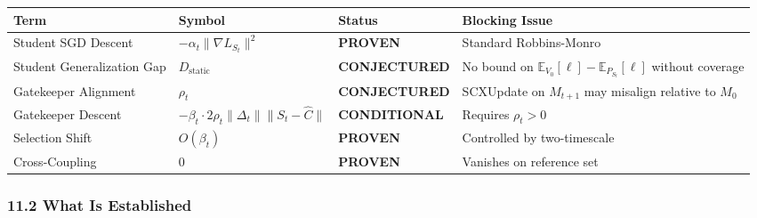 \documentclass[
  12pt,
]{article}
\begin{document}
\begin{longtable}[]{@{}
  >{\raggedright\arraybackslash}p{}
  >{\raggedright\arraybackslash}p{}
  >{\raggedright\arraybackslash}p{}
  >{\raggedright\arraybackslash}p{}@{}}
\toprule\noalign{}
\begin{minipage}[b]{\linewidth}\raggedright
Term
\end{minipage} & \begin{minipage}[b]{\linewidth}\raggedright
Symbol
\end{minipage} & \begin{minipage}[b]{\linewidth}\raggedright
Status
\end{minipage} & \begin{minipage}[b]{\linewidth}\raggedright
Blocking Issue
\end{minipage} \\
\midrule\noalign{}
\endhead
\bottomrule\noalign{}
\endlastfoot
Student SGD Descent & \(-\alpha_t \|\nabla L_{S_t}\|^2\) &
\textbf{PROVEN} & Standard Robbins-Monro \\
Student Generalization Gap & \(D_{\text{static}}\) &
\textbf{CONJECTURED} & No bound on
\(\mathbb{E}_{V_0}[\ell] - \mathbb{E}_{P_{S_t}}[\ell]\) without
coverage \\
Gatekeeper Alignment & \(\rho_t\) & \textbf{CONJECTURED} & SCXUpdate on
\(M_{t+1}\) may misalign relative to \(M_0\) \\
Gatekeeper Descent &
\(-\beta_t \cdot 2\rho_t \|\Delta_t\| \|S_t - \hat{C}\|\) &
\textbf{CONDITIONAL} & Requires \(\rho_t > 0\) \\
Selection Shift & \(O(\beta_t)\) & \textbf{PROVEN} & Controlled by
two-timescale \\
Cross-Coupling & \(0\) & \textbf{PROVEN} & Vanishes on reference set \\
\end{longtable}

\subsubsection{11.2 What Is Established}\label{what-is-established}
\end{document}
